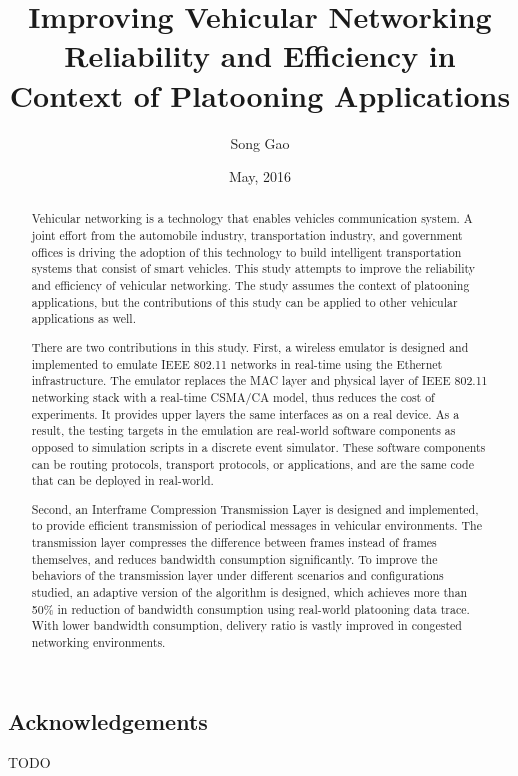 \documentclass[12pt]{report}
\title{Improving Vehicular Networking Reliability and Efficiency in Context of Platooning Applications}
\author{Song Gao}
\date{May, 2016} %
\begin{document}
\begin{romanpages}      %

\TitlePage

\chapter*{Acknowledgements}
%

TODO

\begin{abstract} 
  Vehicular networking is a technology that enables vehicles communication system. A joint effort from the automobile industry, transportation industry, and government offices is driving the adoption of this technology to build intelligent transportation systems that consist of smart vehicles. This study attempts to improve the reliability and efficiency of vehicular networking. The study assumes the context of platooning applications, but the contributions of this study can be applied to other vehicular applications as well.

  There are two contributions in this study. First, a wireless emulator is designed and implemented to emulate IEEE 802.11 networks in real-time using the Ethernet infrastructure. The emulator replaces the MAC layer and physical layer of IEEE 802.11 networking stack with a real-time CSMA/CA model, thus reduces the cost of experiments. It provides upper layers the same interfaces as on a real device. As a result, the testing targets in the emulation are real-world software components as opposed to simulation scripts in a discrete event simulator. These software components can be routing protocols, transport protocols, or applications, and are the same code that can be deployed in real-world.

  Second, an Interframe Compression Transmission Layer is designed and implemented, to provide efficient transmission of periodical messages in vehicular environments. The transmission layer compresses the difference between frames instead of frames themselves, and reduces bandwidth consumption significantly. To improve the behaviors of the transmission layer under different scenarios and configurations studied, an adaptive version of the algorithm is designed, which achieves more than 50\% in reduction of bandwidth consumption using real-world platooning data trace. With lower bandwidth consumption, delivery ratio is vastly improved in congested networking environments.
\end{abstract}

\tableofcontents
\listoffigures
\listoftables

\printnomenclature[1.0in] %
\end{romanpages}        %
\end{document}
